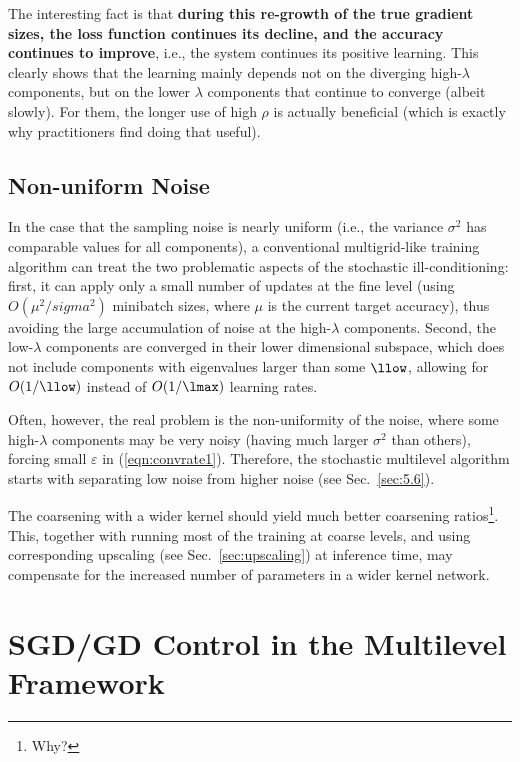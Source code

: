 \documentclass{article} %
\begin{document}
The interesting fact is that \textbf{during this re-growth of the true gradient sizes, the loss function continues its decline, and the accuracy continues to improve}, i.e., the system continues its positive learning. This clearly shows that the learning mainly depends not on the diverging high-$\lambda$ components, but on the lower $\lambda$ components that continue to converge (albeit slowly). For them, the longer use of high $\rho$ is actually beneficial (which is exactly why practitioners find doing that useful).

\subsection{Non-uniform Noise}
In the case that the sampling noise is nearly uniform (i.e., the variance $\sigma^2$ has comparable values for all components), a conventional multigrid-like training algorithm can treat the two problematic aspects of the stochastic ill-conditioning: first, it can apply only a small number of updates at the fine level (using $O(\mu^2/sigma^2)$ minibatch sizes, where $\mu$ is the current target accuracy), thus avoiding the large accumulation of noise at the high-$\lambda$ components. Second, the low-$\lambda$ components are converged in their lower dimensional subspace, which does not include components with eigenvalues larger than some $\llow$, allowing for $O(1/\llow)$ instead of $O(1/\lmax)$ learning rates.

Often, however, the real problem is the non-uniformity of the noise, where some high-$\lambda$ components may be very noisy (having much larger $\sigma^2$ than others), forcing small $\varepsilon$ in (\ref{eqn:convrate1}). Therefore, the stochastic multilevel algorithm starts with separating low noise from higher noise (see Sec.~\ref{sec:5.6}).

The coarsening with a wider kernel should yield much better coarsening ratios\footnote{Why?}. This, together with running most of the training at coarse levels, and using corresponding upscaling (see Sec.~\ref{sec:upscaling}) at inference time, may compensate for the increased number of parameters in a wider kernel network.


\section{SGD/GD Control in the Multilevel Framework}
\label{sec:control}
\end{document}
